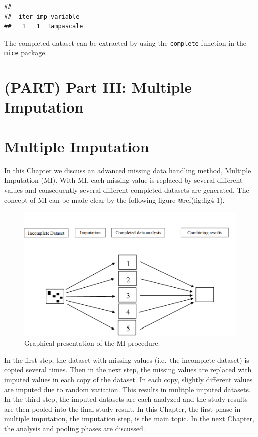 \documentclass[
]{book}
\begin{document}
\begin{verbatim}
## 
##  iter imp variable
##   1   1  Tampascale
\end{verbatim}

The completed dataset can be extracted by using the \texttt{complete}
function in the \texttt{mice} package.

\hypertarget{part-part-iii-multiple-imputation}{%
\chapter*{(PART) Part III: Multiple
Imputation}\label{part-part-iii-multiple-imputation}}

\hypertarget{multiple-imputation}{%
\chapter{Multiple Imputation}\label{multiple-imputation}}

In this Chapter we discuss an advanced missing data handling method,
Multiple Imputation (MI). With MI, each missing value is replaced by
several different values and consequently several different completed
datasets are generated. The concept of MI can be made clear by the
following figure @ref(fig:fig4-1).

\begin{figure}

{\centering \includegraphics[width=0.9\linewidth]{images/fig4.1} 

}

\caption{Graphical presentation of the MI procedure.}\label{fig:fig4-1}
\end{figure}

In the first step, the dataset with missing values (i.e.~the incomplete
dataset) is copied several times. Then in the next step, the missing
values are replaced with imputed values in each copy of the dataset. In
each copy, slightly different values are imputed due to random
variation. This results in mulitple imputed datasets. In the third step,
the imputed datasets are each analyzed and the study results are then
pooled into the final study result. In this Chapter, the first phase in
multiple imputation, the imputation step, is the main topic. In the next
Chapter, the analysis and pooling phases are discussed.
\end{document}
